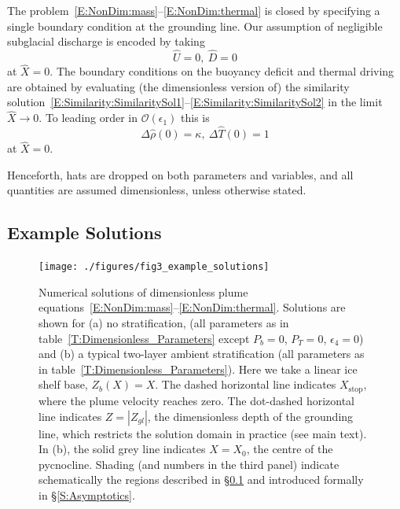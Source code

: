 \documentclass[openacc]{rsproca_new}%
\newcommand{\order}[1]{\mathcal{O}(#1)}
\newcommand{\epsone}{\epsilon_{1}} %
\newcommand{\epsfour}{\epsilon_{4}}
\newcommand{\Pt}{\textit{P}_T}
\begin{document}
The problem~\eqref{E:NonDim:mass}--\eqref{E:NonDim:thermal} is closed by specifying a single boundary condition at the grounding line. Our assumption of negligible subglacial discharge is encoded by taking
\begin{equation}\label{E:NonDim:IC1}
\hat{U} =0,~\hat{D} = 0
\end{equation}
at $\hat{X} = 0$. The boundary conditions on the buoyancy deficit and thermal driving are obtained by evaluating (the dimensionless version of) the similarity solution~\eqref{E:Similarity:SimilaritySol1}--\eqref{E:Similarity:SimilaritySol2} in the limit $\hat{X} \to 0$. To leading order in $\order{\epsone}$ this is
\begin{equation}\label{E:NonDim:IC2}
  \Delta\hat{\rho}(0) = \kappa,~\Delta \hat{T}(0) = 1  
\end{equation}
at $\hat{X} = 0$.

Henceforth, hats are dropped on both parameters and variables, and all quantities are assumed dimensionless, unless otherwise stated.

\subsection{Example Solutions}\label{S:ExampleSolutions}

\begin{figure}
\centering
\texttt{[image: ./figures/fig3\_example\_solutions]}
\caption{Numerical solutions of dimensionless plume equations~\eqref{E:NonDim:mass}--\eqref{E:NonDim:thermal}. Solutions are shown for (a) no stratification, (all parameters as in table~\ref{T:Dimensionless_Parameters} except $P_b = 0$, $\Pt = 0$, $\epsfour = 0$) and (b)  a typical two-layer ambient stratification (all parameters as in table~\ref{T:Dimensionless_Parameters}). Here we take a linear ice shelf base, $Z_b(X) = X$. The dashed horizontal line indicates $X_{\text{stop}}$, where the plume velocity reaches zero. The dot-dashed horizontal line indicates $Z = |Z_{gl}|$, the dimensionless depth of the grounding line, which restricts the solution domain in practice (see main text). In (b), the solid grey line indicates $X = X_0$, the centre of the pycnocline. Shading (and numbers in the third panel) indicate schematically the regions described in \S\ref{S:ExampleSolutions} and introduced formally in \S\ref{S:Asymptotics}. }\label{fig:ExampleSols}
\end{figure}
\end{document}
